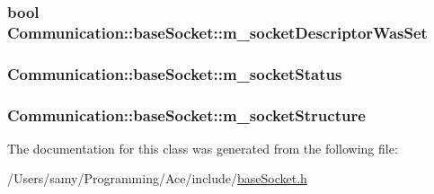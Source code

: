 \subsubsection[{m\+\_\+socket\+Descriptor\+Was\+Set}]{\setlength{\rightskip}{0pt plus 5cm}bool Communication\+::base\+Socket\+::m\+\_\+socket\+Descriptor\+Was\+Set\hspace{0.3cm}{\ttfamily [private]}}\label{class_communication_1_1base_socket_ab4ef6d96459a000539623e28c7d926ce}
\hypertarget{class_communication_1_1base_socket_a4102d51354af1c2f5a34a3bdc21be0bb}{}
\subsubsection[{m\+\_\+socket\+Status}]{ Communication\+::base\+Socket\+::m\+\_\+socket\+Status\hspace{0.3cm}{\ttfamily [private]}}\label{class_communication_1_1base_socket_a4102d51354af1c2f5a34a3bdc21be0bb}
\hypertarget{class_communication_1_1base_socket_a61e4cefccf27fbc3365af9ab2a4b1228}{}
\subsubsection[{m\+\_\+socket\+Structure}]{ Communication\+::base\+Socket\+::m\+\_\+socket\+Structure\hspace{0.3cm}{\ttfamily [private]}}\label{class_communication_1_1base_socket_a61e4cefccf27fbc3365af9ab2a4b1228}


The documentation for this class was generated from the following file\+:\begin{DoxyCompactItemize}
\item 
/\+Users/samy/\+Programming/\+Ace/include/\hyperlink{base_socket_8h}{base\+Socket.\+h}\end{DoxyCompactItemize}
